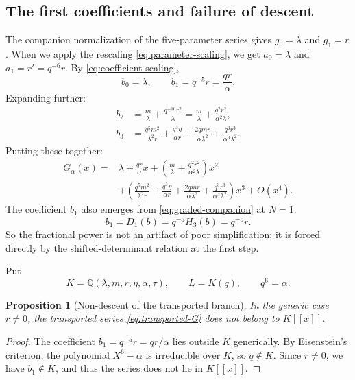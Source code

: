 \documentclass[11pt]{article}
\newtheorem{proposition}[theorem]{Proposition}
\theoremstyle{definition}
\theoremstyle{remark}
\newcommand{\Q}{\mathbb{Q}}
\begin{document}
\subsection{The first coefficients and failure of descent}
The companion normalization of the five-parameter series gives $g_0=\lambda$ and
$g_1=r$. When we apply the rescaling \eqref{eq:parameter-scaling}, we get
$a_0=\lambda$ and $a_1=r'=q^{-6}r$. By \eqref{eq:coefficient-scaling},
\begin{equation}
 b_0=\lambda,\qquad b_1=q^{-5}r=\frac{qr}{\alpha}.
 \label{eq:first-coefficients}
\end{equation}
Expanding further:
\begin{align}
 b_2&=\frac{m}{\lambda}+\frac{q^{-10}r^2}{\lambda}
     =\frac{m}{\lambda}+\frac{q^2r^2}{\alpha^2\lambda},
 \label{eq:b2}\\
 b_3&=\frac{q^5m^2}{\lambda^2r}
 +\frac{q^3\eta}{\alpha r}
 +\frac{2qmr}{\alpha\lambda^2}
 +\frac{q^3r^3}{\alpha^3\lambda^2}.
 \label{eq:b3}
\end{align}
Putting these together:
\begin{equation}
\begin{aligned}
G_\alpha(x)={}&\lambda+\frac{qr}{\alpha}x
 +\left(\frac{m}{\lambda}+\frac{q^2r^2}{\alpha^2\lambda}\right)x^2\\
&+\left(\frac{q^5m^2}{\lambda^2r}
 +\frac{q^3\eta}{\alpha r}
 +\frac{2qmr}{\alpha\lambda^2}
 +\frac{q^3r^3}{\alpha^3\lambda^2}\right)x^3+O(x^4).
\end{aligned}
\label{eq:series-expansion}
\end{equation}
The coefficient $b_1$ also emerges from \eqref{eq:graded-companion} at $N=1$:
\[
 b_1=D_1(b)=q^{-5}H_3(b)=q^{-5}r.
\]
So the fractional power is not an artifact of poor simplification; it is forced
directly by the shifted-determinant relation at the first step.

Put
\[
 K=\Q(\lambda,m,r,\eta,\alpha,\tau),\qquad
 L=K(q),\qquad q^6=\alpha.
\]
\begin{proposition}[Non-descent of the transported branch]
In the generic case $r\neq0$, the transported series \eqref{eq:transported-G}
does not belong to $K[[x]]$.
\end{proposition}
\begin{proof}
The coefficient $b_1=q^{-5}r=qr/\alpha$ lies outside $K$ generically. By
Eisenstein's criterion, the polynomial $X^6-\alpha$ is irreducible over $K$, so
$q\notin K$. Since $r\neq0$, we have $b_1\notin K$, and thus the series does not
lie in $K[[x]]$.
\end{proof}
\end{document}
